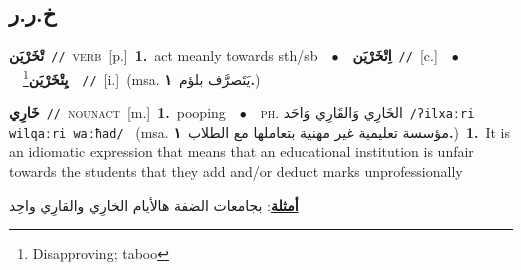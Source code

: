 \documentclass[10pt,a4paper,twoside]{article} %
\begin{document}
\begin{multicols}{2}
\vspace{-3mm}
\subsection*{\color{blue}\foreignlanguage{arabic}{خ.ر.ر}\color{blue}{}} 

{\setlength\topsep{0pt}\textbf{\foreignlanguage{arabic}{تْخَرْيَن}}\ {\color{gray}\texttt{//}\color{black}}\ \textsc{verb}\ [p.]\ \textbf{1.}~act meanly towards sth/sb\ \ $\bullet$\ \ \setlength\topsep{0pt}\textbf{\foreignlanguage{arabic}{اِتْخَرْيَن}}\ {\color{gray}\texttt{//}\color{black}}\ [c.]\ \ $\bullet$\ \ \setlength\topsep{0pt}\textbf{\foreignlanguage{arabic}{يِتْخَرْيَن}}\footnote{Disapproving; taboo}\ \ {\color{gray}\texttt{//}\color{black}}\ [i.]\ \color{gray}(msa. \foreignlanguage{arabic}{يَتَصرَّف بلؤم}~\foreignlanguage{arabic}{\textbf{١.}})\color{black}\ } \vspace{2mm}

{\setlength\topsep{0pt}\textbf{\foreignlanguage{arabic}{خَارِي}}\ {\color{gray}\texttt{//}\color{black}}\ \textsc{noun\textunderscore act}\ [m.]\ \textbf{1.}~pooping\ \ $\bullet$\ \ \textsc{ph.} \color{gray} \foreignlanguage{arabic}{الخَارِي وَالقَارِي وَاحَد}\color{black}\ {\color{gray}\texttt{/{\sffamily ʔilxaːri wilqaːri waːħad}/}\color{black}}\ \color{gray} (msa. \foreignlanguage{arabic}{مؤسسة تعليمية غير مهنية بتعاملها مع الطلاب}~\foreignlanguage{arabic}{\textbf{١.}})\color{black}\ \textbf{1.}~It is an idiomatic expression that means that an educational institution is unfair towards the students that they add and/or deduct marks unprofessionally\  \begin{flushright}\color{gray}\foreignlanguage{arabic}{\textbf{\underline{\foreignlanguage{arabic}{أمثلة}}}: بجامعات الضفة هالأيام الخارِي والقارِي واحِد}\end{flushright}\color{black}} \vspace{2mm}


\end{multicols}
\end{document}
